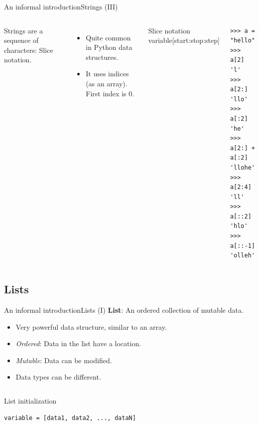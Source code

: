 \documentclass[10pt,compress]{beamer} %
\begin{document}
\begin{frame}[fragile]{An informal introduction}{Strings (III)}
	\vspace{-0.3cm}
	\begin{columns}
	        Strings are a sequence of characters: \alert{Slice notation}.
	        \begin{itemize}
	            \item Quite common in Python data structures.
	            \item It uses indices (as an array). First index is $0$.
	        \end{itemize}

            \begin{block}{Slice notation}
                variable[start:stop:step]
            \end{block}

			\begin{exampleblock}{}
            \vspace{-0.3cm}
		    \begin{verbatim}
>>> a = "hello"
>>> a[2]
'l'
>>> a[2:]
'llo'
>>> a[:2]
'he'
>>> a[2:] + a[:2]
'llohe'
>>> a[2:4]
'll'
>>> a[::2]
'hlo'
>>> a[::-1]
'olleh'
\end{verbatim}
            \vspace{-0.2cm}
				\end{exampleblock}
		\end{columns}
\end{frame}


\subsection{Lists}
\begin{frame}[fragile]{An informal introduction}{Lists (I)}
	\textbf{List}: An ordered collection of mutable data.
	\begin{itemize}
		\item Very powerful data structure, similar to an array.
		\item \textit{Ordered}: Data in the list have a location.
		\item \textit{Mutable}: Data can be modified.
		\item Data types can be different.
	\end{itemize}
	\begin{columns}
   		\column{.70\textwidth}
		\begin{block}{List initialization}
		\begin{verbatim}
variable = [data1, data2, ..., dataN]
\end{verbatim}
		\end{block}
	\end{columns}
\end{frame}
\end{document}
